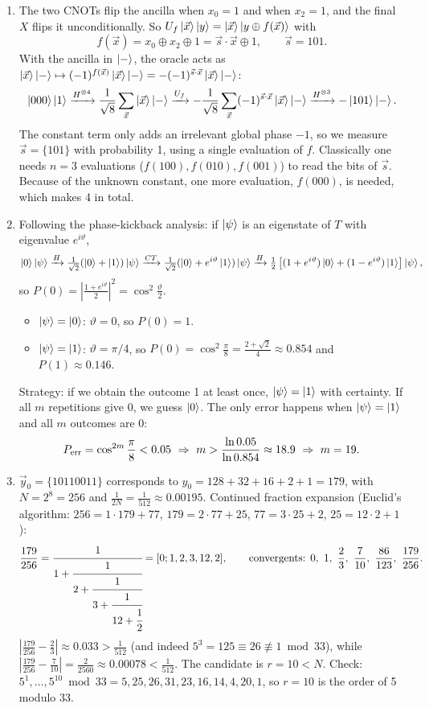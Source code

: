 \documentclass[11pt,a4paper]{article}
\begin{document}
\begin{enumerate}
\item The two CNOTs flip the ancilla when $x_0=1$ and when $x_2=1$, and the final $X$ flips it
unconditionally. So $U_f\ket{\vec x}\ket y=\ket{\vec x}\ket{y\oplus f(\vec x)}$ with
\[
f(\vec x)=x_0\oplus x_2\oplus1=\vec s\cdot\vec x\oplus1,\qquad \vec s=101 .
\]
With the ancilla in $\ket-$, the oracle acts as $\ket{\vec x}\ket-\mapsto(-1)^{f(\vec x)}\ket{\vec x}\ket-=-(-1)^{\vec s\cdot\vec x}\ket{\vec x}\ket-$:
\[
\ket{000}\ket1\xrightarrow{H^{\otimes4}}\frac1{\sqrt8}\sum_{\vec x}\ket{\vec x}\ket-
\xrightarrow{U_f}-\frac1{\sqrt8}\sum_{\vec x}(-1)^{\vec s\cdot\vec x}\ket{\vec x}\ket-
\xrightarrow{H^{\otimes3}}-\ket{101}\ket- .
\]
The constant term only adds an irrelevant global phase $-1$, so we measure $\vec s=\{101\}$
with probability 1, using a single evaluation of $f$. Classically one needs $n=3$ evaluations
($f(100),f(010),f(001)$) to read the bits of $\vec s$. Because of the unknown constant, one more
evaluation, $f(000)$, is needed, which makes 4 in total.

\item Following the phase-kickback analysis: if $\ket\psi$ is an eigenstate of $T$ with eigenvalue
$e^{i\vartheta}$,
\[
\ket0\ket\psi\xrightarrow{H}\tfrac1{\sqrt2}(\ket0+\ket1)\ket\psi\xrightarrow{CT}\tfrac1{\sqrt2}(\ket0+e^{i\vartheta}\ket1)\ket\psi
\xrightarrow{H}\tfrac12\left[(1+e^{i\vartheta})\ket0+(1-e^{i\vartheta})\ket1\right]\ket\psi,
\]
so $P(0)=\left|\frac{1+e^{i\vartheta}}2\right|^2=\cos^2\frac\vartheta2$.
\begin{itemize}
\item $\ket\psi=\ket0$: $\vartheta=0$, so $P(0)=1$.
\item $\ket\psi=\ket1$: $\vartheta=\pi/4$, so $P(0)=\cos^2\frac\pi8=\frac{2+\sqrt2}{4}\approx0.854$ and $P(1)\approx0.146$.
\end{itemize}
Strategy: if we obtain the outcome 1 at least once, $\ket\psi=\ket1$ with certainty. If all $m$
repetitions give 0, we guess $\ket0$. The only error happens when $\ket\psi=\ket1$ and all $m$ outcomes are 0:
\[
P_{\rm err}=\cos^{2m}\frac\pi8<0.05\ \Rightarrow\ m>\frac{\ln0.05}{\ln0.854}\approx18.9\ \Rightarrow\ m=19 .
\]

\item $\vec y_0=\{10110011\}$ corresponds to $y_0=128+32+16+2+1=179$, with $N=2^8=256$ and
$\frac1{2N}=\frac1{512}\approx0.00195$. Continued fraction expansion (Euclid's algorithm:
$256=1\cdot179+77$, $179=2\cdot77+25$, $77=3\cdot25+2$, $25=12\cdot2+1$):
\[
\frac{179}{256}=\cfrac{1}{1+\cfrac{1}{2+\cfrac{1}{3+\cfrac{1}{12+\cfrac12}}}}=[0;1,2,3,12,2],
\qquad\text{convergents: }0,\ 1,\ \frac23,\ \frac7{10},\ \frac{86}{123},\ \frac{179}{256}.
\]
$\left|\frac{179}{256}-\frac23\right|\approx0.033>\frac1{512}$ (and indeed $5^3=125\equiv26\not\equiv1 \bmod 33$), while
$\left|\frac{179}{256}-\frac7{10}\right|=\frac{2}{2560}\approx0.00078<\frac1{512}$. The candidate is $r=10<N$.
Check: $5^1,\dots,5^{10}\bmod 33=5,25,26,31,23,16,14,4,20,1$, so $r=10$ is the order of 5 modulo 33.


\end{enumerate}
\end{document}
